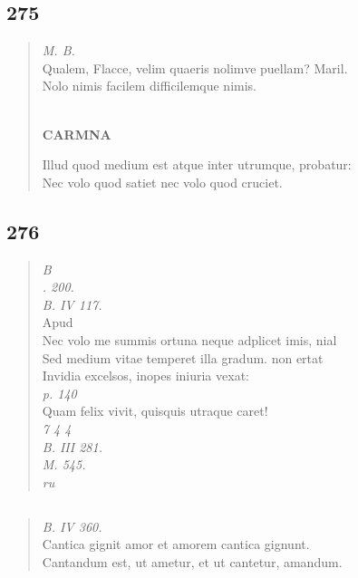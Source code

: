 \documentclass[11pt, a4paper]{report}
\begin{document}
            \subsection*{275}
      \begin{verse}
      \textit{M. B.} \\ Qualem, Flacce, velim quaeris nolimve puellam? Maril. \\ Nolo nimis facilem difficilemque nimis. \\ 
        ﻿\pagebreak 
    \begin{center} \textbf{CARMNA} \end{center} \marginpar{[218]} Illud quod medium est atque inter utrumque, probatur: \\ Nec volo quod satiet nec volo quod cruciet. \\ 
      \end{verse}
  
            \subsection*{276}
      \begin{verse}
      \textit{B} \\ \textit{. 200.} \\ \textit{B. IV 117.} \\ Apud \\ Nec volo me summis ortuna neque adplicet imis, nial \\ Sed medium vitae temperet illa gradum. non ertat \\ Invidia excelsos, inopes iniuria vexat: \\ \textit{p. 140} \\ Quam felix vivit, quisquis utraque caret! \\ \textit{7 4 4} \\ \textit{B. III 281.} \\ \textit{M. 545.} \\ \textit{ru} \\ 
      \end{verse}
  
            \subsection*{}
      \begin{verse}
      \textit{B. IV 360.} \\ Cantica gignit amor et amorem cantica gignunt. \\ Cantandum est, ut ametur, et ut cantetur, amandum. \\ 
      \end{verse}
  
\end{document}
